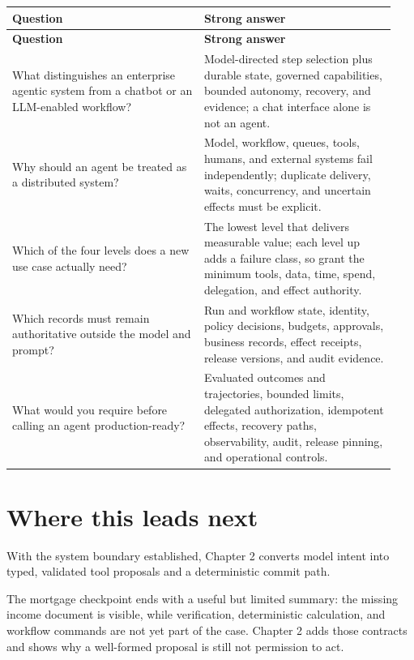 \BookTableStart
\small
\begin{longtable}{@{}Y{0.4700\linewidth}Y{0.4700\linewidth}@{}}
\color{white}\bfseries \textbf{Question} & \color{white}\bfseries \textbf{Strong answer} \\
\endfirsthead
{}
\color{white}\bfseries \textbf{Question} & \color{white}\bfseries \textbf{Strong answer} \\
\endhead
What distinguishes an enterprise agentic system from a chatbot or an LLM-enabled workflow? & Model-directed step selection plus durable state, governed capabilities, bounded autonomy, recovery, and evidence; a chat interface alone is not an agent. \\
Why should an agent be treated as a distributed system? & Model, workflow, queues, tools, humans, and external systems fail independently; duplicate delivery, waits, concurrency, and uncertain effects must be explicit. \\
Which of the four levels does a new use case actually need? & The lowest level that delivers measurable value; each level up adds a failure class, so grant the minimum tools, data, time, spend, delegation, and effect authority. \\
Which records must remain authoritative outside the model and prompt? & Run and workflow state, identity, policy decisions, budgets, approvals, business records, effect receipts, release versions, and audit evidence. \\
What would you require before calling an agent production-ready? & Evaluated outcomes and trajectories, bounded limits, delegated authorization, idempotent effects, recovery paths, observability, audit, release pinning, and operational controls. \\
\end{longtable}
\BookTableEnd

\section{Where this leads next}

With the system boundary established, Chapter 2 converts model intent into typed, validated tool proposals and a deterministic commit path.\par

The mortgage checkpoint ends with a useful but limited summary: the missing income document is visible, while verification, deterministic calculation, and workflow commands are not yet part of the case. Chapter 2 adds those contracts and shows why a well-formed proposal is still not permission to act.\par

